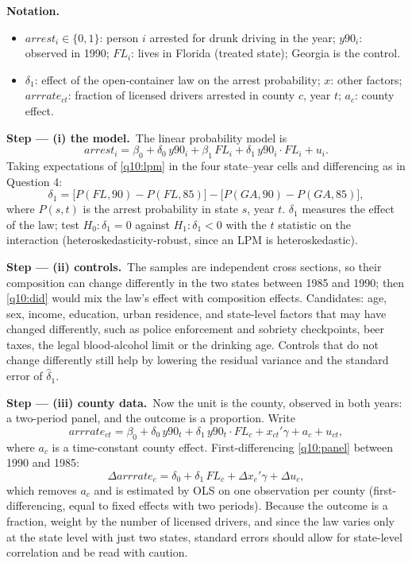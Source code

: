 \documentclass[11pt,a4paper]{article}
\newenvironment{notacao}{\par\smallskip\noindent\textbf{Notation.}\begin{itemize}[leftmargin=1.4em,topsep=1pt,itemsep=0pt]\small}{\end{itemize}}
\newcommand{\passo}[2]{\par\smallskip\noindent\textbf{Step --- #1.}~#2}
\begin{document}
\begin{sol}
\begin{notacao}
\item $arrest_i\in\{0,1\}$: person $i$ arrested for drunk driving in the year; $y90_i$: observed in 1990;
$FL_i$: lives in Florida (treated state); Georgia is the control.
\item $\delta_1$: effect of the open-container law on the arrest probability; $x$: other factors;
$arrrate_{ct}$: fraction of licensed drivers arrested in county $c$, year $t$; $a_c$: county effect.
\end{notacao}

\passo{(i) the model}{The linear probability model is
\begin{equation}
arrest_i=\beta_0+\delta_0\,y90_i+\beta_1\,FL_i+\delta_1\,y90_i\cdot FL_i+u_i.\label{q10:lpm}
\end{equation}
Taking expectations of \eqref{q10:lpm} in the four state--year cells and differencing as in Question 4:
\begin{equation}
\delta_1=\big[P(FL,90)-P(FL,85)\big]-\big[P(GA,90)-P(GA,85)\big],\label{q10:did}
\end{equation}
where $P(s,t)$ is the arrest probability in state $s$, year $t$. $\delta_1$ measures the effect of the law;
test $H_0:\delta_1=0$ against $H_1:\delta_1<0$ with the $t$ statistic on the interaction
(heteroskedasticity-robust, since an LPM is heteroskedastic).}

\passo{(ii) controls}{The samples are independent cross sections, so their composition can change
differently in the two states between 1985 and 1990; then \eqref{q10:did} would mix the law's effect with
composition effects. Candidates: age, sex, income, education, urban residence, and state-level factors that
may have changed differently, such as police enforcement and sobriety checkpoints, beer taxes, the legal
blood-alcohol limit or the drinking age. Controls that do not change differently still help by lowering the
residual variance and the standard error of $\hat\delta_1$.}

\passo{(iii) county data}{Now the unit is the county, observed in both years: a two-period panel, and the
outcome is a proportion. Write
\begin{equation}
arrrate_{ct}=\beta_0+\delta_0\,y90_t+\delta_1\,y90_t\cdot FL_c+x_{ct}'\gamma+a_c+u_{ct},\label{q10:panel}
\end{equation}
where $a_c$ is a time-constant county effect. First-differencing \eqref{q10:panel} between 1990 and 1985:
\begin{equation}
\Delta arrrate_c=\delta_0+\delta_1\,FL_c+\Delta x_c'\gamma+\Delta u_c,\label{q10:fd}
\end{equation}
which removes $a_c$ and is estimated by OLS on one observation per county (first-differencing, equal to
fixed effects with two periods). Because the outcome is a fraction, weight by the number of licensed
drivers, and since the law varies only at the state level with just two states, standard errors should
allow for state-level correlation and be read with caution.}


\end{sol}
\end{document}

